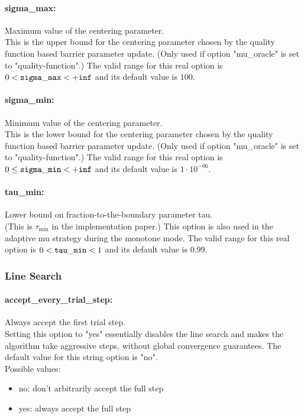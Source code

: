 \paragraph{sigma\_max:}\label{sec:sigma_max} Maximum value of the centering parameter. $\;$ \\
 This is the upper bound for the centering
parameter chosen by the quality function based
barrier parameter update. (Only used if option
"mu\_oracle" is set to "quality-function".) The valid range for this real option is 
$0 <  {\tt sigma\_max } <  {\tt +inf}$
and its default value is $100$.


\paragraph{sigma\_min:}\label{sec:sigma_min} Minimum value of the centering parameter. $\;$ \\
 This is the lower bound for the centering
parameter chosen by the quality function based
barrier parameter update. (Only used if option
"mu\_oracle" is set to "quality-function".) The valid range for this real option is 
$0 \le {\tt sigma\_min } <  {\tt +inf}$
and its default value is $1 \cdot 10^{-06}$.


\paragraph{tau\_min:}\label{sec:tau_min} Lower bound on fraction-to-the-boundary parameter tau. $\;$ \\
 (This is $\tau_{\min}$ in the implementation paper.) 
This option is also used in the adaptive mu
strategy during the monotone mode. The valid range for this real option is 
$0 <  {\tt tau\_min } <  1$
and its default value is $0.99$.


\subsubsection{Line Search}
\label{sec:Line_Search}

\paragraph{accept\_every\_trial\_step:}\label{sec:accept_every_trial_step} Always accept the first trial step. $\;$ \\
 Setting this option to "yes" essentially disables
the line search and makes the algorithm take
aggressive steps, without global convergence
guarantees.
The default value for this string option is "no".
\\ 
Possible values:
\begin{itemize}
   \item no: don't arbitrarily accept the full step
   \item yes: always accept the full step
\end{itemize}

